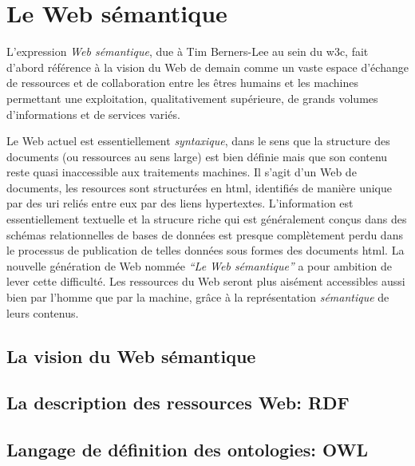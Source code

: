 \chapter{Le Web sémantique}
\label{annexe:semantic-web}

L'expression \emph{Web sémantique}, due à Tim Berners-Lee
\cite{berners2001semantic} au sein du \acrshort{w3c}, fait d'abord
référence à la vision du Web de demain comme un vaste espace d'échange
de ressources et de collaboration entre les êtres humains et les
machines permettant une exploitation, qualitativement supérieure, de
grands volumes d'informations et de services variés.\medskip

Le Web actuel est essentiellement \emph{syntaxique}, dans le sens que
la structure des documents (ou ressources au sens large) est bien
définie mais que son contenu reste quasi inaccessible aux traitements
machines. Il s'agit d'un Web de documents, les resources sont
structurées en \acrshort{html}, identifiés de manière unique par des
\acrshort{uri} reliés entre eux par des liens
hypertextes. L'information est essentiellement textuelle et la
strucure riche qui est généralement conçus dans des schémas
relationnelles de bases de données est presque complètement perdu dans
le processus de publication de telles données sous formes des
documents \acrshort{html}. La nouvelle génération de Web nommée
\emph{``Le Web sémantique''} a pour ambition de lever cette
difficulté. Les ressources du Web seront plus aisément accessibles
aussi bien par l'homme que par la machine, grâce à la représentation
\emph{sémantique} de leurs contenus.

\newpage
\section{La vision du Web sémantique}
\label{sec:semantic-web-vision}

\section{La description des ressources Web: RDF}
\label{sec:semantic-web-rdf}

\section{Langage de définition des ontologies: OWL}
\label{sec:semantic-web-owl}


